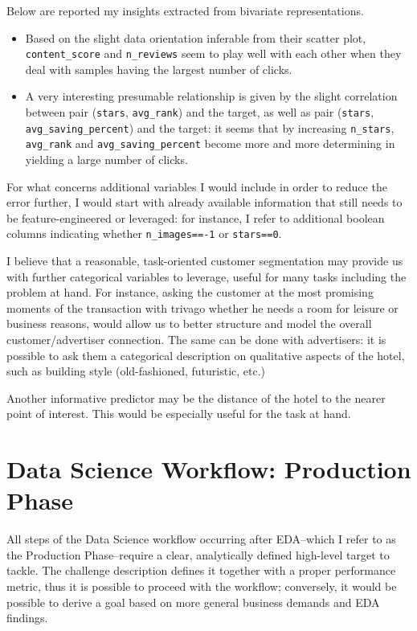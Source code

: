 \documentclass[preprint,12pt,3p]{elsarticle}
\begin{document}
Below are reported my insights extracted from bivariate representations.
\begin{itemize}
	\item Based on the slight data orientation inferable from their scatter plot, \verb|content_score| and \verb|n_reviews| seem to play well with each other when they deal with samples having the largest number of clicks.
	\item A very interesting presumable relationship is given by the slight correlation between pair (\verb|stars|, \verb|avg_rank|) and the target, as well as pair (\verb|stars|, \verb|avg_saving_percent|) and the target: it seems that by increasing \verb|n_stars|, \verb|avg_rank| and \verb|avg_saving_percent| become more and more determining in yielding a large number of clicks.
\end{itemize}

For what concerns additional variables I would include in order to reduce the error further, I would start with already available information that still needs to be feature-engineered or leveraged: for instance, I refer to additional boolean columns indicating whether \verb|n_images==-1| or \verb|stars==0|.

I believe that a reasonable, task-oriented customer segmentation may provide us with further categorical variables to leverage, useful for many tasks including the problem at hand. For instance, asking the customer at the most promising moments of the transaction with trivago whether he needs a room for leisure or business reasons, would allow us to better structure and model the overall customer/advertiser connection. The same can be done with advertisers: it is possible to ask them a categorical description on qualitative aspects of the hotel, such as building style (old-fashioned, futuristic, etc.)

Another informative predictor may be the distance of the hotel to the nearer point of interest. This would be especially useful for the task at hand.

\section{Data Science Workflow: Production Phase}
All steps of the Data Science workflow occurring after EDA--which I refer to as the Production Phase--require a clear, analytically defined high-level target to tackle. The challenge description defines it together with a proper performance metric, thus it is possible to proceed with the workflow; conversely, it would be possible to derive a goal based on more general business demands and EDA findings.
\end{document}

